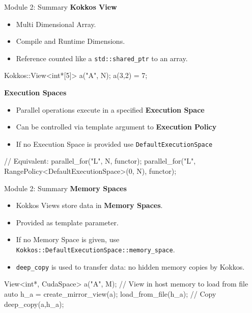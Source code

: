 \begin{frame}[fragile]{Module 2: Summary}
	\textbf{Kokkos View}
	\begin{itemize}
		\item Multi Dimensional Array.
		\item Compile and Runtime Dimensions.
		\item Reference counted like a \texttt{std::shared\_ptr} to an array.
	\end{itemize}
\begin{code}[keywords={View,int}]
	Kokkos::View<int*[5]> a("A", N);
	a(3,2) = 7;
\end{code}

	\textbf{Execution Spaces}
	\begin{itemize}
		\item{Parallel operations execute in a specified \textbf{Execution Space}}
		\item{Can be controlled via template argument to \textbf{Execution Policy}}
		\item{If no Execution Space is provided use \texttt{DefaultExecutionSpace}}
	\end{itemize}
\begin{code}[keywords={parallel_for,Cuda,RangePolicy}]
// Equivalent:
parallel_for("L", N, functor);
parallel_for("L",
  RangePolicy<DefaultExecutionSpace>(0, N), functor);
\end{code}
\end{frame}

\begin{frame}[fragile]{Module 2: Summary}
	\textbf{Memory Spaces}
	\begin{itemize}
		\item Kokkos Views store data in \textbf{Memory Spaces}.
		\item Provided as template parameter.
		\item If no Memory Space is given, use  \texttt{Kokkos::DefaultExecutionSpace::memory\_space}.
		\item \texttt{deep\_copy} is used to transfer data: no hidden memory copies by Kokkos.
	\end{itemize}
\begin{code}[keywords={View,int,CudaSpace,create_mirror_view}]
	View<int*, CudaSpace> a("A", M);
	// View in host memory to load from file
	auto h_a = create_mirror_view(a);
        load_from_file(h_a);
	// Copy
	deep_copy(a,h_a);
\end{code}

\end{frame}

